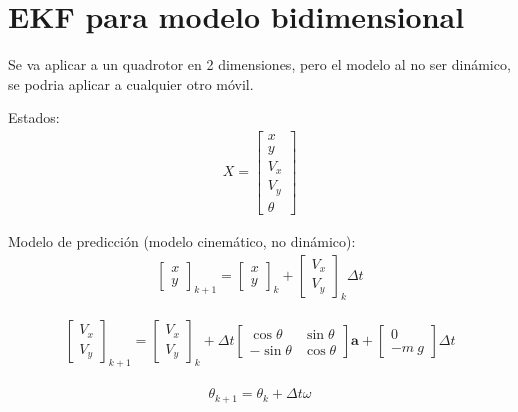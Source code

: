 \section{EKF para modelo bidimensional}
Se va aplicar a un quadrotor en 2 dimensiones, pero el modelo al no ser dinámico, se podria aplicar a cualquier otro móvil.

Estados:
\begin{align}
X = 
\begin{bmatrix} 
x \\ y \\ V_x \\ V_y \\ \theta
\end{bmatrix}
\end{align}

Modelo de predicción (modelo cinemático, no dinámico):
\begin{align}
\begin{bmatrix} 
x \\ y 
\end{bmatrix}_{k+1}
=
\begin{bmatrix} 
x \\ y 
\end{bmatrix}_k
+
\begin{bmatrix} 
V_x \\ V_y 
\end{bmatrix}_k
\Delta t
\end{align}

\begin{align}
\begin{bmatrix} 
V_x \\ V_y 
\end{bmatrix}_{k+1}
=
\begin{bmatrix} 
V_x \\ V_y 
\end{bmatrix}_k + 
\Delta t
\begin{bmatrix} 
\cos{\theta} & \sin{\theta} \\ -\sin{\theta} & \cos{\theta}
\end{bmatrix}
\bm{a} +  
\begin{bmatrix} 
0 \\ - m\ g 
\end{bmatrix}\Delta t
\end{align}

\begin{align}
\theta_{k+1} = \theta_k + \Delta t \omega
\end{align}


